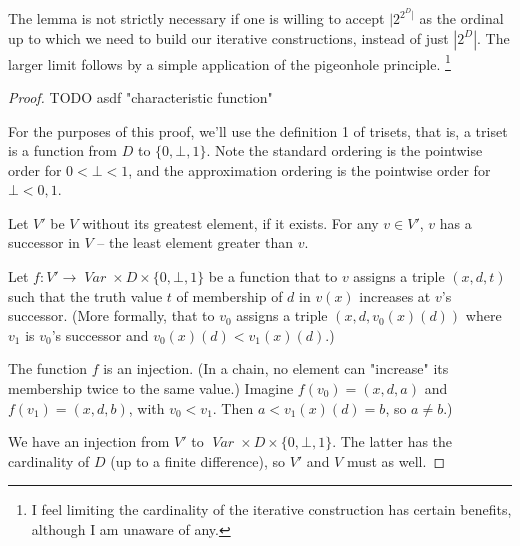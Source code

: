 \documentclass[oneside,12pt]{book}
\theoremstyle{definition}
\theoremstyle{remark}
\newcommand\var[1]{\mathop{\mathit{#1}}\nolimits}
\newcommand{\Var}{\var{Var}}
\begin{document}
The lemma is not strictly necessary if one is willing to accept $|2^{2^D|}$
as the ordinal up to which we need to build our iterative constructions,
instead of just $|2^D|$. The larger limit follows by a simple application
of the pigeonhole principle.%
\footnote{I feel limiting the cardinality of the iterative construction
has certain benefits, although I am unaware of any.}

\wellOrderedChainsSmall*

\begin{proof}
  TODO asdf "characteristic function"
  
  For the purposes of this proof, we'll use the definition 1 of trisets, that is,
  a triset is a function from $D$ to $\{0,\bot,1\}$. Note the standard
  ordering is the pointwise order for $0 < \bot < 1$, and the approximation
  ordering is the pointwise order for $\bot < 0,1$.
  
  Let $V'$ be $V$ without its greatest element, if it exists. For any $v \in V'$,
  $v$ has a successor in $V$ -- the least element greater than $v$.
  
  Let $f\colon V' \to \Var \times D \times \{0,\bot,1\}$ be a function
  that to $v$ assigns a triple $(x, d, t)$ such that the truth value $t$
  of membership of $d$ in $v(x)$ increases at $v$'s successor. (More formally,
  that to $v_0$ assigns a triple $(x, d, v_0(x)(d))$ where $v_1$ is $v_0$'s
  successor and $v_0(x)(d) < v_1(x)(d)$.)
  
  The function $f$ is an injection. (In a chain, no element can "increase" its
  membership twice to the same value.) Imagine $f(v_0) = (x, d, a)$ and
  $f(v_1) = (x, d, b)$, with $v_0 < v_1$. Then $a < v_1(x)(d) = b$, so $a \neq b$.)
  
  We have an injection from $V'$ to $\Var \times D \times \{0,\bot,1\}$.
  The latter has the cardinality of $D$ (up to a finite difference),
  so $V'$ and $V$ must as well.
\end{proof}

\pagebreak

\lemmaCoConst*
\end{document}
